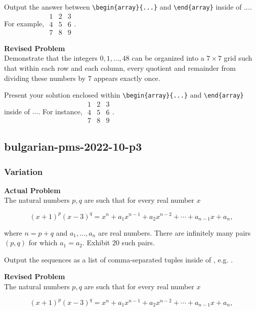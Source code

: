 Output the answer between \verb|\begin{array}{...}| and \verb|\end{array}| inside of $\boxed{...}$. For example, $\boxed{\begin{array}{ccc}1 & 2 & 3 \\ 4 & 5 & 6 \\ 7 & 8 & 9\end{array}}$.

\textbf{Revised Problem}\\
Demonstrate that the integers $0, 1, \ldots, 48$ can be organized into a $7 \times 7$ grid such that within each row and each column, every quotient and remainder from dividing these numbers by $7$ appears exactly once.

Present your solution enclosed within \verb|\begin{array}{...}| and \verb|\end{array}| inside of $\boxed{...}$. For instance, $\boxed{\begin{array}{ccc}1 & 2 & 3 \\ 4 & 5 & 6 \\ 7 & 8 & 9\end{array}}$.

\subsection{bulgarian-pms-2022-10-p3}
\subsubsection{Variation}
\textbf{Actual Problem}\\
The natural numbers $p, q$ are such that for every real number $x$

$$
(x+1)^{p}(x-3)^{q}=x^{n}+a_{1} x^{n-1}+a_{2} x^{n-2}+\cdots+a_{n-1} x+a_{n},
$$

where $n=p+q$ and $a_{1}, \ldots, a_{n}$ are real numbers. There are infinitely many pairs $(p, q)$ for which $a_{1}=a_{2}$. Exhibit $20$ such pairs.

Output the sequences as a list of comma-separated tuples inside of \boxed, e.g. \boxed{[(2, 19), (3, 123)]}.

\textbf{Revised Problem}\\
The natural numbers $p, q$ are such that for every real number $x$

$$
(x+1)^{p}(x-3)^{q}=x^{n}+a_{1} x^{n-1}+a_{2} x^{n-2}+\cdots+a_{n-1} x+a_{n},
$$

